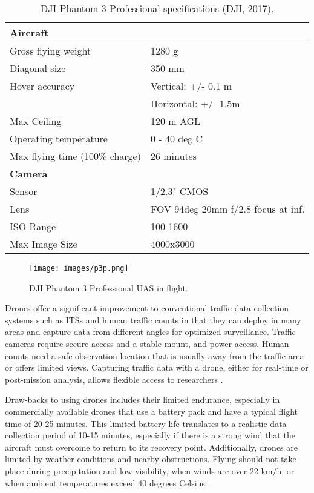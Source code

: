 \documentclass[preprint,12pt,a4paper]{elsarticle}
\begin{document}
\begin{linenumbers}
\begin{enumerate}
\end{enumerate}

\begin{table}[H]
\centering
\caption{DJI Phantom 3 Professional specifications (DJI, 2017).}
\label{tb:p3p-specs}
\begin{tabular}{@{}ll@{}}
\hline
\textbf{Aircraft} &  \\ \hline
Gross flying weight & 1280 g \\
Diagonal size & 350 mm \\
Hover accuracy & Vertical: +/- 0.1 m \\
 & Horizontal: +/- 1.5m \\
Max Ceiling & 120 m AGL \\
Operating temperature & 0 - 40 deg C \\
Max flying time (100\% charge) & 26 minutes \\ \hline
\textbf{Camera} &  \\ \hline
Sensor & 1/2.3" CMOS \\
Lens & FOV 94deg 20mm f/2.8 focus at inf. \\
ISO Range & 100-1600 \\
Max Image Size & 4000x3000 \\ \hline
\end{tabular}
\end{table}

%
\begin{figure}
\centering
\texttt{[image: images/p3p.png]}  %
\caption{DJI Phantom 3 Professional UAS in flight.}
\label{fig:p3p}
\end{figure}
%
Drones offer a significant improvement to conventional traffic data collection systems such as ITSs and human traffic counts in that they can deploy in many areas and capture data from different angles for optimized surveillance. Traffic cameras require secure access and a stable mount, and power access. Human counts need a safe observation location that is usually away from the traffic area or offers limited views. Capturing traffic data with a drone, either for real-time or post-mission analysis, allows flexible access to researchers \citep{Westoby2012}. 

Draw-backs to using drones includes their limited endurance, especially in commercially available drones that use a battery pack and have a typical flight time of 20-25 minutes. This limited battery life translates to a realistic data collection period of 10-15 minutes, especially if there is a strong wind that the aircraft must overcome to return to its recovery point. Additionally, drones are limited by weather conditions and nearby obstructions. Flying should not take place during precipitation and low visibility, when winds are over 22 km/h, or when ambient temperatures exceed 40 degrees Celsius \citep{DJI2017}.


\end{linenumbers}
\end{document}
